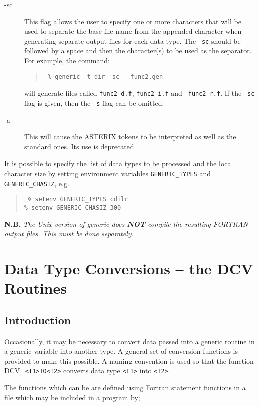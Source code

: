 \begin{description}
\item[-sc] This flag allows the user to specify one or more characters that
will be used to separate the base file name from the appended character when
generating separate output files for each data type. The {\tt -sc} should be
followed by a space and then the character(s) to be used as the separator. For
example, the command:

\begin{quote}{\tt
\% generic -t dir -sc \_ func2.gen
}
\end{quote}

will generate files called {\tt func2\_d.f}, {\tt func2\_i.f} and {\tt
func2\_r.f}. If the {\tt -sc} flag is given, then the {\tt -s} flag can be
omitted.

\item[-a] This will cause the ASTERIX tokens to be interpreted as well as the
standard ones. Its use is deprecated.

\end{description}

It is possible to specify the list of data types to be processed and the local
character size by setting environment variables {\tt GENERIC\_TYPES} and {\tt
GENERIC\_CHASIZ}, e.g.

\begin{quote}{\tt
\% setenv GENERIC\_TYPES cdilr \\
\% setenv GENERIC\_CHASIZ 300
}
\end{quote}

{\bf N.B.} {\em The Unix version of generic does {\bf NOT} compile the
resulting FORTRAN output files. This must be done separately.}


\section{Data Type Conversions -- the DCV Routines}

\subsection{Introduction}

Occasionally, it may be necessary to convert data passed into
a generic routine in a generic variable into another type.
A general set of conversion functions is provided to make this
possible.
A naming convention is used so that the function
DCV\_\verb+<T1>TO<T2>+ converts data type \verb+<T1>+ into \verb+<T2>+.

The functions which can be are defined using Fortran statement 
functions in a file which may be included in a program by;

